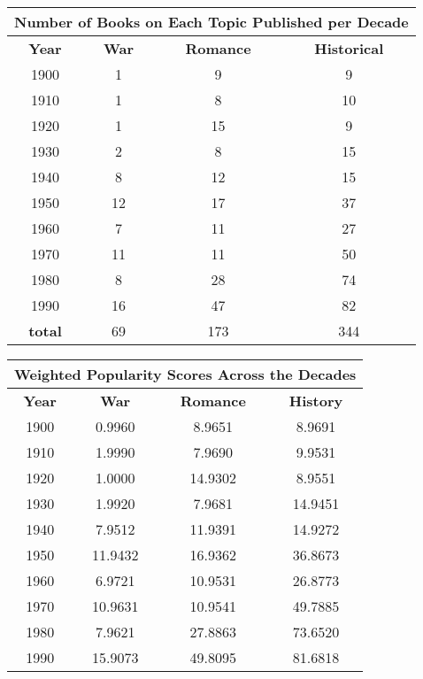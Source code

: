 \documentclass[twoside]{article}
\begin{document}
\begin{table}[h]
\centering
    \begin{tabular}{|c|c|c|c|}
        \hline
        \multicolumn{4}{|c|}{Number of Books on Each Topic Published per Decade} \\
        \hline
        \textbf{Year} & \textbf{War} & \textbf{Romance} & \textbf{Historical} \\
        \hline
        1900 & 1 & 9 & 9 \\
        \hline
        1910 & 1 & 8 & 10 \\
        \hline
        1920 & 1 & 15 & 9 \\
        \hline 
        1930 & 2 & 8 & 15 \\
        \hline 
        1940 & 8 & 12 & 15 \\
        \hline
        1950 & 12 & 17 & 37 \\
        \hline
        1960 & 7 & 11 & 27 \\
        \hline
        1970 & 11 & 11 & 50 \\
        \hline
        1980 & 8 & 28 & 74 \\
        \hline
        1990 & 16 & 47 & 82 \\
        \hline
        \textbf{total} & 69 & 173 & 344 \\
        \hline
    \end{tabular}
\end{table}
\begin{table}[h]
\centering
	\begin{tabular}{|c|c|c|c|}
	\hline
	\multicolumn{4}{|c|}{Weighted Popularity Scores Across the Decades} \\
	\hline
	\textbf{Year} & \textbf{War} & \textbf{Romance} & \textbf{History} \\
	\hline
	1900 & 0.9960 & 8.9651 & 8.9691  \\
	\hline
	1910 & 1.9990 & 7.9690 & 9.9531 \\
	\hline
	1920 & 1.0000 & 14.9302 & 8.9551 \\
	\hline
	1930 & 1.9920 & 7.9681 & 14.9451 \\
	\hline
	1940 & 7.9512 & 11.9391 & 14.9272 \\
	\hline
	1950 & 11.9432 & 16.9362 & 36.8673 \\
	\hline
	1960 & 6.9721 & 10.9531 & 26.8773 \\
	\hline
	1970 & 10.9631 & 10.9541 & 49.7885 \\
	\hline
	1980 & 7.9621 & 27.8863 & 73.6520 \\
	\hline
	1990 & 15.9073 & 49.8095 & 81.6818 \\
	\hline
	\end{tabular}
\end{table}
\end{document}
